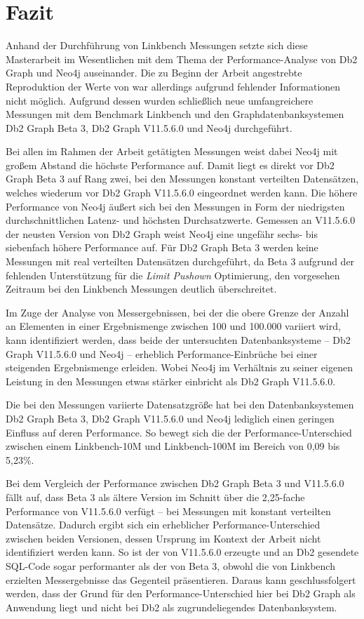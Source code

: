 \chapter{Fazit}
\label{fazit}
Anhand der Durchführung von Linkbench Messungen setzte sich diese Masterarbeit im Wesentlichen mit dem Thema der Performance-Analyse von Db2 Graph und Neo4j auseinander. Die zu Beginn der Arbeit angestrebte Reproduktion der Werte von  war allerdings aufgrund fehlender Informationen nicht möglich. Aufgrund dessen wurden schließlich neue umfangreichere Messungen mit dem Benchmark Linkbench und den Graphdatenbanksystemen Db2 Graph Beta 3, Db2 Graph V11.5.6.0 und Neo4j durchgeführt. 

Bei allen im Rahmen der Arbeit getätigten Messungen weist dabei Neo4j mit großem Abstand die höchste Performance auf. Damit liegt es direkt vor Db2 Graph Beta 3 auf Rang zwei, bei den Messungen konstant verteilten Datensätzen, welches wiederum vor Db2 Graph V11.5.6.0 eingeordnet werden kann. Die höhere Performance von Neo4j äußert sich bei den Messungen in Form der niedrigsten durchschnittlichen Latenz- und höchsten Durchsatzwerte. Gemessen an V11.5.6.0 der neusten Version von Db2 Graph weist Neo4j eine ungefähr sechs- bis siebenfach höhere Performance auf. Für Db2 Graph Beta 3 werden keine Messungen mit real verteilten Datensätzen durchgeführt, da Beta 3 aufgrund der fehlenden Unterstützung für die \textit{Limit Pushown} Optimierung, den vorgesehen Zeitraum bei den Linkbench Messungen deutlich überschreitet.

Im Zuge der Analyse von Messergebnissen, bei der die obere Grenze der Anzahl an Elementen in einer Ergebnismenge zwischen 100 und 100.000 variiert wird, kann identifiziert werden, dass beide der untersuchten Datenbanksysteme -- Db2 Graph V11.5.6.0 und Neo4j -- erheblich Performance-Einbrüche bei einer steigenden Ergebnismenge erleiden. Wobei Neo4j im Verhältnis zu seiner eigenen Leistung in den Messungen etwas stärker einbricht als Db2 Graph V11.5.6.0. 

Die bei den Messungen variierte Datensatzgröße hat bei den Datenbanksystemen Db2 Graph Beta 3, Db2 Graph V11.5.6.0 und Neo4j lediglich einen geringen Einfluss auf deren Performance. So bewegt sich die der Performance-Unterschied zwischen einem Linkbench-10M und Linkbench-100M im Bereich von 0,09 bis 5,23\%.

Bei dem Vergleich der Performance zwischen Db2 Graph Beta 3 und V11.5.6.0 fällt auf, dass Beta 3 als ältere Version im Schnitt über die 2,25-fache Performance von V11.5.6.0 verfügt -- bei Messungen mit konstant verteilten Datensätze. Dadurch ergibt sich ein erheblicher Performance-Unterschied zwischen beiden Versionen, dessen Ursprung im Kontext der Arbeit nicht identifiziert werden kann. So ist der von V11.5.6.0 erzeugte und an Db2 gesendete SQL-Code sogar performanter als der von Beta 3, obwohl die von Linkbench erzielten Messergebnisse das Gegenteil präsentieren. Daraus kann geschlussfolgert werden, dass der Grund für den Performance-Unterschied hier bei Db2 Graph als Anwendung liegt und nicht bei Db2 als zugrundeliegendes Datenbanksystem.

